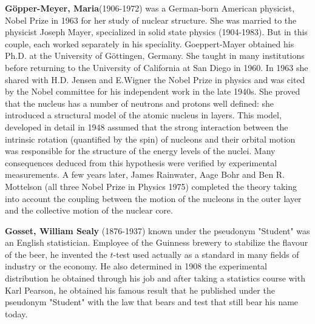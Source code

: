 \textbf{Göpper-Meyer, Maria}(1906-1972) was a German-born American physicist, Nobel Prize in 1963 for her study of nuclear structure. She was married to the physicist Joseph Mayer, specialized in solid state physics (1904-1983). But in this couple, each worked separately in his speciality. Goeppert-Mayer obtained his Ph.D. at the University of Göttingen, Germany. She taught in many institutions before returning to the University of California at San Diego in 1960. In 1963 she shared with H.D. Jensen and  E.Wigner the Nobel Prize in physics and was cited by the Nobel committee for his independent work in the late 1940s. She proved that the nucleus has a number of neutrons and protons well defined: she introduced a structural model of the atomic nucleus in layers. This model, developed in detail in 1948 assumed that the strong interaction between the intrinsic rotation (quantified by the spin) of nucleons and their orbital motion was responsible for the structure of the energy levels of the nuclei. Many consequences deduced from this hypothesis were verified by experimental measurements. A few years later, James Rainwater, Aage Bohr and Ben R. Mottelson (all three Nobel Prize in Physics 1975) completed the theory taking into account the coupling between the motion of the nucleons in the outer layer and the collective motion of the nuclear core.

\textbf{Gosset, William Sealy} (1876-1937) known under the pseudonym "Student" was an English statistician. Employee of the Guinness brewery to stabilize the flavour of the beer, he invented the $t$-test used actually as a standard in many fields of industry or the economy. He also determined in 1908 the experimental distribution he obtained through his job and after taking a statistics course with Karl Pearson, he obtained his famous result that he published under the pseudonym "Student" with the law that bears and test that still bear his name today.\\

